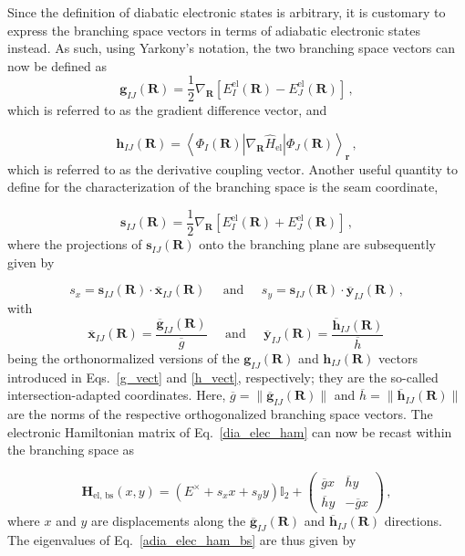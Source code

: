 \documentclass[9pt,bestpractices]{livecoms}
\newcommand{\R}{\mathbf{R}}
\newcommand{\re}{\mathbf{r}}
\newcommand{\g}[2]{\mathbf{g}_{#1#2}(\R)}
\newcommand{\gua}[2]{\overline{\mathbf{g}}_{#1#2}(\R)}
\newcommand{\h}[2]{\mathbf{h}_{#1#2}(\R)}
\newcommand{\hua}[2]{\overline{\mathbf{h}}_{#1#2}(\R)}
\newcommand{\s}[2]{\mathbf{s}_{#1#2}(\R)}
\newcommand{\xua}[2]{\overline{\mathbf{x}}_{#1#2}(\R)}
\newcommand{\yua}[2]{\overline{\mathbf{y}}_{#1#2}(\R)}
\begin{document}
Since the definition of diabatic electronic states is arbitrary,\cite{ferre_description_2015, Persico2018, nikiforov_assessment_2014} it is customary to express the branching space vectors in terms of adiabatic electronic states instead. 
As such, using Yarkony’s notation,\cite{yarkony_conical_2001} the two branching space vectors can now be defined as
\begin{equation}
\label{g_vect}
    \g{I}{J} = \frac{1}{2} \nabla_{\R} \left[E_I^{\text{el}}(\R) - E_J^{\text{el}}(\R)\right] \, ,
\end{equation}
which is referred to as the gradient difference vector, and

\begin{equation}
\label{h_vect}
    \h{I}{J} = \left< \Phi_I(\R) | \nabla_{\R}\hat{H}_{\text{el}} | \Phi_J(\R) \right>_{\re} \, ,
\end{equation}
which is referred to as the derivative coupling vector.
Another useful quantity to define for the characterization of the branching space is the seam coordinate,\cite{zhang_nonadiabatic_2021} 

\begin{equation}
\label{s_vect}
    \s{I}{J} = \frac{1}{2} \nabla_{\R} \left[E_I^{\text{el}}(\R) + E_J^{\text{el}}(\R)\right] \, ,
\end{equation}
where the projections of $\s{I}{J}$ onto the branching plane are subsequently given by

\begin{equation}
\label{sx_and_sy}
    s_x = \s{I}{J} \cdot \xua{I}{J} \;\;\;\;\; \text{and} \;\;\;\;\; s_y = \s{I}{J} \cdot \yua{I}{J} \, ,
\end{equation}
with
\begin{equation}
\label{int_adapt_coords}
    \xua{I}{J} = \frac{\gua{I}{J}}{\overline{g}} \;\;\;\;\; \text{and} \;\;\;\;\; \yua{I}{J} = \frac{\hua{I}{J}}{\overline{h}} \, 
\end{equation}
being the orthonormalized versions of the $\g{I}{J}$ and $\h{I}{J}$ vectors introduced in Eqs.~\eqref{g_vect} and \eqref{h_vect}, respectively; they are the so-called intersection-adapted coordinates.
Here, $\overline{g} = \|\gua{I}{J}\|$ and $\overline{h} = \|\hua{I}{J}\|$ are the norms of the respective orthogonalized branching space vectors.
The electronic Hamiltonian matrix of Eq.~\eqref{dia_elec_ham} can now be recast within the branching space as 

\begin{equation}
\label{adia_elec_ham_bs}
    \mathbf{H}_{\text{el, bs}}(x, y) = \left(E^\times + s_x x + s_y y\right)\mathbb{I}_2 + 
    \begin{pmatrix}
        \overline{g}x & \overline{h}y \\
        \overline{h}y & -\overline{g}x
    \end{pmatrix} \, ,
\end{equation}
where $x$ and $y$ are displacements along the $\gua{I}{J}$ and $\hua{I}{J}$ directions.\cite{matsika_nonadiabatic_2011}
The eigenvalues of Eq.~\eqref{adia_elec_ham_bs} are thus given by
\end{document}
